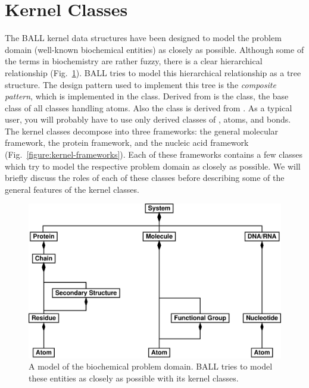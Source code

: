 \section{Kernel Classes}
\label{section:kernelclasses}

The BALL kernel data structures have been designed to model the problem 
domain (\ie well-known biochemical entities) as closely as possible.
Although some of the terms in biochemistry are rather fuzzy, there is a clear
hierarchical relationship (Fig.~\ref{figure:problem-domain}).
BALL tries to model this hierarchical relationship as a tree structure.
The design pattern used to implement this tree is the {\em composite
pattern}\cite{DesignPatterns}, which is implemented in the 
class. Derived from  is the  class, the
base class of all classes handling atoms. Also the  class is 
derived from . As a typical user, you will probably have to 
use only derived classes of , atoms, and bonds. The kernel
classes decompose into three frameworks: the general molecular framework, the 
protein framework, and the nucleic acid framework 
(Fig.~\ref{figure:kernel-frameworks}).
Each of these frameworks contains a few classes which try to model the
respective problem domain as closely as possible. We will briefly discuss the
roles of each of these classes before describing some of the general features
of the kernel classes.

\begin{figure}[tb]
  \centering\includegraphics[width=\textwidth]{problem-domain.eps}
  \caption{A model of the biochemical problem domain. BALL tries to model
           these entities as closely as possible with its kernel classes.}
  \label{figure:problem-domain}
\end{figure}

